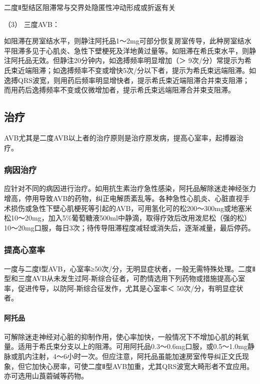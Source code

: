 二度Ⅱ型结区阻滞常与交界处隐匿性冲动形成或折返有关

\hypertarget{text00297.htmlux5cux23CHP10-2-10-2-3-3-3}{}
（3） 三度AVB：

如阻滞在房室结水平，则静注阿托品1～2mg可部分恢复房室传导，此种房室结水平阻滞多见于心肌炎、急性下壁梗死及洋地黄过量等。如阻滞在希氏束水平，则静注阿托品无效。但静注20分钟内，如逸搏频率明显增加（＞
9次/分）常提示为希氏束近端阻滞；如逸搏频率不变或增快5次/分以下者，提示为希氏束远端阻滞。如逸搏QRS波宽，则用药后频率明显增快者，提示希氏束近端阻滞合并束支阻滞；而用药后逸搏频率不变或仅微增加者，提示希氏束远端阻滞合并束支阻滞。

\subsection{治疗}

AVB尤其是二度AVB以上者的治疗原则是治疗原发病，提高心室率，起搏器治疗。

\subsubsection{病因治疗}

应针对不同的病因进行治疗。如用抗生素治疗急性感染，阿托品解除迷走神经张力增高，停用导致AVB的药物，纠正电解质紊乱等。各种急性心肌炎、心脏直视手术损伤或急性下壁心肌梗死等引起的AVB，可用氢化可的松200～300mg或地塞米松10～20mg，加入5\%葡萄糖液500ml中静滴，取得疗效后改用泼尼松（强的松）10～20mg口服，每日3次；待传导阻滞程度减轻或消失后，逐渐减量，最后停药。

\subsubsection{提高心室率}

一度与二度Ⅰ型AVB，心室率≥50次/分，无明显症状者，一般无需特殊处理。二度Ⅱ型和三度AVB从未发生过阿-斯综合征者，可酌情选用下列药物或措施提高心室率，促进传导，以防阿-斯综合征发作，尤其是心室率＜
50次/分，有明显症状者。

\paragraph{阿托品}

可解除迷走神经对心脏的抑制作用，使心率加快，一般情况下不增加心肌的耗氧量。适用于希氏束分支以上的阻滞。可用阿托品0.3～0.6mg口服，或0.5～1.0mg静脉或肌内注射，4～6小时一次。但应注意，阿托品虽能加速房室传导纠正文氏现象，但它加快心房率，可使二度Ⅱ型AVB加重，尤其QRS波宽大畸形者不宜应用。亦可选用山莨菪碱等药物。

